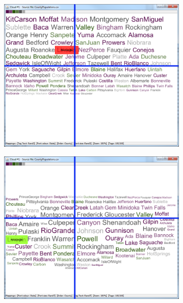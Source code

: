 \begin{figure}[!htb]
\begin{subfigure}{.5\textwidth}
  \includegraphics[scale=0.25]{Experiment1/Trial3/C2S2L2.png}
\end{subfigure}%
\begin{subfigure}{.5\textwidth}
  \centering
 \includegraphics[scale=0.25]{Experiment1/Trial3/C2S2L1.png}
\end{subfigure}
\begin{subfigure}{.5\textwidth}
  \centering

\end{subfigure}
\end{figure}
